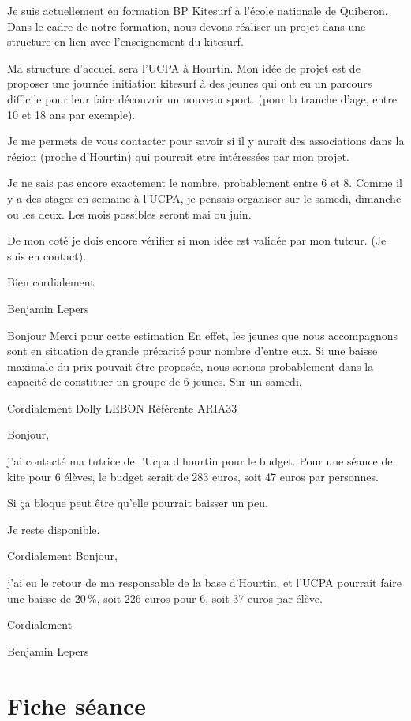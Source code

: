 \documentclass[12pt,a4paper]{report}
\begin{document}
Je suis actuellement en formation BP Kitesurf à l'école nationale de Quiberon.
Dans le cadre de notre formation, nous devons réaliser un projet dans
une structure en lien avec l'enseignement du kitesurf.

Ma structure d'accueil sera l'UCPA à Hourtin.
Mon idée de projet est de proposer une journée initiation kitesurf à
des jeunes qui ont eu un parcours difficile pour leur faire découvrir
un nouveau sport.
 (pour la tranche d'age, entre 10 et 18 ans par exemple).

Je me permets de vous contacter pour savoir si il y aurait des
associations dans la région (proche d'Hourtin) qui pourrait etre
intéressées par mon projet.

Je ne sais pas encore exactement le nombre, probablement entre 6 et 8.
Comme il y a des stages en semaine à l'UCPA, je pensais organiser sur
le samedi, dimanche ou les deux. Les mois possibles seront mai ou
juin.

De mon coté je dois encore vérifier si mon idée est validée par mon
tuteur. (Je suis en contact).


Bien cordialement

Benjamin Lepers

\bigskip
Bonjour
Merci pour cette estimation
En effet, les jeunes que nous accompagnons sont en situation de grande
précarité pour nombre d'entre eux. Si une baisse maximale du prix
pouvait être proposée, nous serions probablement dans la capacité
de constituer un groupe de 6 jeunes. Sur un samedi.

Cordialement
Dolly LEBON
Référente ARIA33

\bigskip
Bonjour,

j'ai contacté ma tutrice de l'Ucpa d'hourtin pour le budget.
Pour une séance de kite  pour 6 élèves, le budget serait de 283 euros,
soit 47 euros par personnes.

Si ça bloque peut être qu'elle pourrait baisser un peu.


Je reste disponible.

Cordialement
\bigskip
Bonjour,

j'ai eu le retour de ma responsable de la base d'Hourtin, et l'UCPA
pourrait faire une baisse de 20\,\%, soit 226 euros pour 6, soit 37 euros
par élève.

Cordialement

Benjamin Lepers
\chapter{Fiche séance\label{fiche_seance}}
\end{document}
